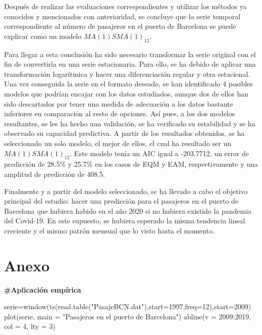 \documentclass[
]{article}
\newenvironment{Shaded}{\begin{snugshade}}{\end{snugshade}}
\newcommand{\AttributeTok}[1]{\textcolor[rgb]{0.77,0.63,0.00}{#1}}
\newcommand{\DecValTok}[1]{\textcolor[rgb]{0.00,0.00,0.81}{#1}}
\newcommand{\FunctionTok}[1]{\textcolor[rgb]{0.00,0.00,0.00}{#1}}
\newcommand{\NormalTok}[1]{#1}
\newcommand{\OtherTok}[1]{\textcolor[rgb]{0.56,0.35,0.01}{#1}}
\newcommand{\SpecialCharTok}[1]{\textcolor[rgb]{0.00,0.00,0.00}{#1}}
\newcommand{\StringTok}[1]{\textcolor[rgb]{0.31,0.60,0.02}{#1}}
\begin{document}
Después de realizar las evaluaciones correspondientes y utilizar los
métodos ya conocidos y mencionados con anterioridad, se concluye que la
serie temporal correspondiente al número de pasajeros en el puerto de
Barcelona se puede explicar como un modelo \(MA(1)SMA(1)_{12}\).

Para llegar a esta conclusión ha sido necesario transformar la serie
original con el fin de convertirla en una serie estacionaria. Para ello,
se ha debido de aplicar una transformación logarítmica y hacer una
diferenciación regular y otra estacional. Una vez conseguida la serie en
el formato deseado, se han identificado 4 posibles modelos que podrían
encajar con los datos estudiados, aunque dos de ellos han sido
descartados por tener una medida de adecuación a los datos bastante
inferiores en comparación al resto de opciones. Así pues, a los dos
modelos resultantes, se les ha hecho una validación, se ha verificado su
estabilidad y se ha observado su capacidad predictiva. A partir de los
resultados obtenidos, se ha seleccionado un solo modelo, el mejor de
ellos, el cual ha resultado ser un \(MA(1)SMA(1)_{12}\). Este modelo
tenía un AIC igual a -203.7712, un error de predicción de 28.5\% y
25.7\% en los casos de EQM y EAM, respectivamente y una amplitud de
predicción de 408.5.

Finalmente y a partir del modelo seleccionado, se ha llevado a cabo el
objetivo principal del estudio: hacer una predicción para el pasajeros
en el puerto de Barcelona que hubiera habido en el año 2020 si no
hubiera existido la pandemia del Covid-19. En este supuesto, se hubiera
esperado la misma tendencia lineal creciente y el mismo patrón mensual
que lo visto hasta el momento.

\pagebreak

\hypertarget{anexo}{%
\section{Anexo}\label{anexo}}

\textbf{\#Aplicación empírica}

\begin{Shaded}
\begin{Highlighting}[]
\NormalTok{serie}\OtherTok{=}\FunctionTok{window}\NormalTok{(}\FunctionTok{ts}\NormalTok{(}\FunctionTok{read.table}\NormalTok{(}\StringTok{"PasajeBCN.dat"}\NormalTok{),}\AttributeTok{start=}\DecValTok{1997}\NormalTok{,}\AttributeTok{freq=}\DecValTok{12}\NormalTok{),}\AttributeTok{start=}\DecValTok{2009}\NormalTok{)}
\FunctionTok{plot}\NormalTok{(serie, }\AttributeTok{main =} \StringTok{"Pasajeros en el puerto de Barcelona"}\NormalTok{)}
\FunctionTok{abline}\NormalTok{(}\AttributeTok{v =} \DecValTok{2009}\SpecialCharTok{:}\DecValTok{2019}\NormalTok{, }\AttributeTok{col =} \DecValTok{4}\NormalTok{, }\AttributeTok{lty =} \DecValTok{3}\NormalTok{)}
\end{Highlighting}
\end{Shaded}
\end{document}
